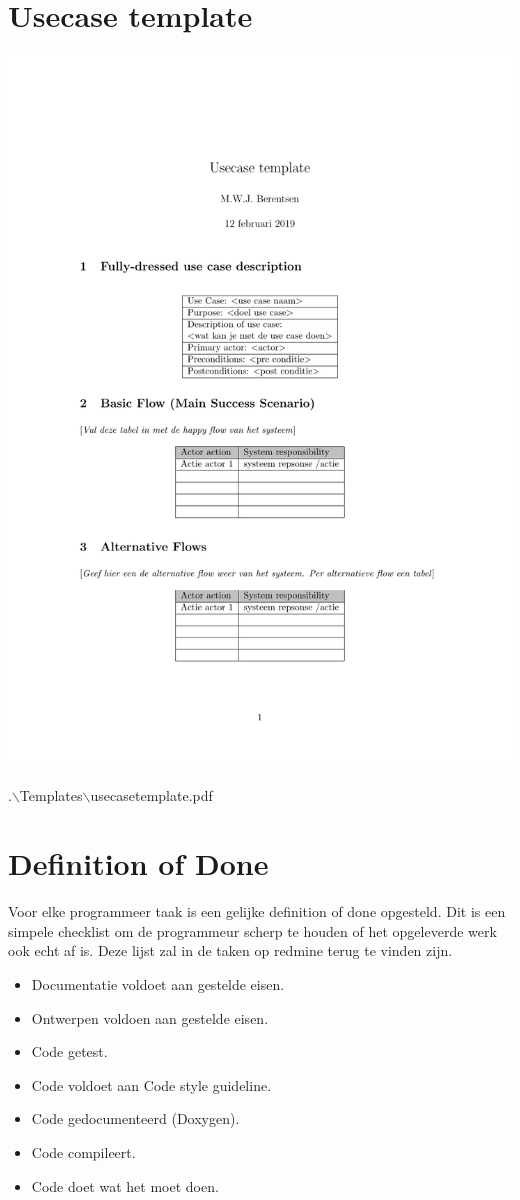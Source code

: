 \documentclass[a4paper, 11pt, oneside]{report}
\begin{document}
\chapter{Usecase template}
\label{app:usecasetemplate}

\begin{center}\includegraphics[page=1,width=.8\linewidth]{Templates/Usecase/usecasetemplate.pdf}\end{center}
.$\backslash$Templates$\backslash$usecasetemplate.pdf

\chapter{Definition of Done}
\label{app:DoD}
Voor elke programmeer taak is een gelijke definition of done opgesteld.
Dit is een simpele checklist om de programmeur scherp te houden of het opgeleverde werk ook echt af is.
Deze lijst zal in de taken op redmine terug te vinden zijn.

\begin{itemize}
	\item Documentatie voldoet aan gestelde eisen.
	\item Ontwerpen voldoen aan gestelde eisen.
	\item Code getest.
	\item Code voldoet aan Code style guideline.
	\item Code gedocumenteerd (Doxygen).
	\item Code compileert.
	\item Code doet wat het moet doen.
\end{itemize}
\end{document}
